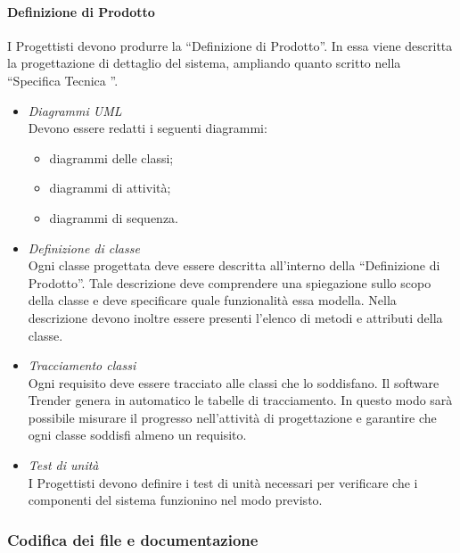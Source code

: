 \paragraph{Definizione di Prodotto}
I Progettisti devono produrre la “Definizione di Prodotto”. In essa viene descritta la progettazione di dettaglio del sistema, ampliando quanto scritto nella “Specifica Tecnica \VersioneST ”.
\begin{itemize}
\item \emph{Diagrammi UML}\\
Devono essere redatti i seguenti diagrammi:
\begin{itemize}
\item diagrammi delle classi;
\item diagrammi di attività;
\item diagrammi di sequenza.
\end{itemize}

\item \emph{Definizione di classe}\\
Ogni classe progettata deve essere descritta all’interno della “Definizione di Prodotto”. Tale descrizione deve comprendere una spiegazione sullo scopo della classe e deve specificare quale funzionalità essa modella. Nella descrizione devono inoltre essere presenti l’elenco di metodi e attributi della classe.
\item \emph{Tracciamento classi}\\
Ogni requisito deve essere tracciato alle classi che lo soddisfano. Il software
Trender genera in automatico le tabelle di tracciamento. In questo modo sarà possibile misurare il progresso nell’attività di progettazione e garantire che ogni classe soddisfi almeno un requisito.
\item \emph{Test di unità}\\
I Progettisti devono definire i test di unità necessari per verificare che i componenti del sistema funzionino nel modo previsto.
\end{itemize}


\subsubsection{Codifica dei file e documentazione}
